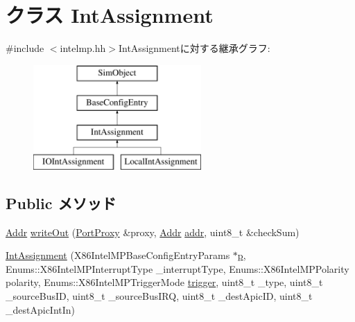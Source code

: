 \hypertarget{classX86ISA_1_1IntelMP_1_1IntAssignment}{
\section{クラス IntAssignment}
\label{classX86ISA_1_1IntelMP_1_1IntAssignment}
}


{\ttfamily \#include $<$intelmp.hh$>$}IntAssignmentに対する継承グラフ:\begin{figure}[H]
\begin{center}
\leavevmode
\includegraphics[height=4cm]{classX86ISA_1_1IntelMP_1_1IntAssignment}
\end{center}
\end{figure}
\subsection*{Public メソッド}
\begin{DoxyCompactItemize}
\item 
\hyperlink{base_2types_8hh_af1bb03d6a4ee096394a6749f0a169232}{Addr} \hyperlink{classX86ISA_1_1IntelMP_1_1IntAssignment_a5fffc1006b1f28bd779d83ffbe213b4f}{writeOut} (\hyperlink{classPortProxy}{PortProxy} \&proxy, \hyperlink{base_2types_8hh_af1bb03d6a4ee096394a6749f0a169232}{Addr} \hyperlink{namespaceX86ISA_ab705917f60c5566f9ce56a93f798b2e2}{addr}, uint8\_\-t \&checkSum)
\item 
\hyperlink{classX86ISA_1_1IntelMP_1_1IntAssignment_aca4fa9c3c387158dc365f5ab07c5aae1}{IntAssignment} (X86IntelMPBaseConfigEntryParams $\ast$\hyperlink{namespaceX86ISA_af675c1d542a25b96e11164b80809a856}{p}, Enums::X86IntelMPInterruptType \_\-interruptType, Enums::X86IntelMPPolarity polarity, Enums::X86IntelMPTriggerMode \hyperlink{namespaceX86ISA_a23ab51ec25f2500855e38a8fb465e451}{trigger}, uint8\_\-t \_\-type, uint8\_\-t \_\-sourceBusID, uint8\_\-t \_\-sourceBusIRQ, uint8\_\-t \_\-destApicID, uint8\_\-t \_\-destApicIntIn)
\end{DoxyCompactItemize}
